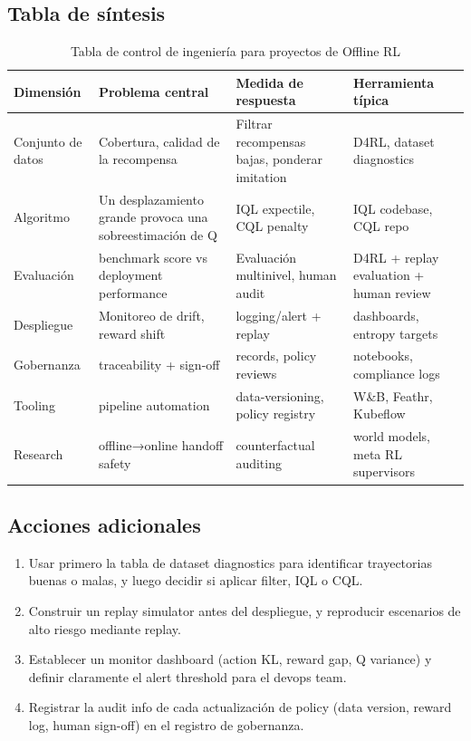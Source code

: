 \documentclass[a4paper]{article}
\begin{document}
\subsection{Tabla de síntesis}

\begin{table}[H]
\centering
\begin{tabular}{p{} p{} p{} p{}}
\toprule
Dimensión & Problema central & Medida de respuesta & Herramienta típica \\
\midrule
Conjunto de datos & Cobertura, calidad de la recompensa & Filtrar recompensas bajas, ponderar imitation & D4RL, dataset diagnostics \\
Algoritmo & Un desplazamiento grande provoca una sobreestimación de Q & IQL expectile, CQL penalty & IQL codebase, CQL repo \\
Evaluación & benchmark score vs deployment performance & Evaluación multinivel, human audit & D4RL + replay evaluation + human review \\
Despliegue & Monitoreo de drift, reward shift & logging/alert + replay & dashboards, entropy targets \\
Gobernanza & traceability + sign-off & records, policy reviews & notebooks, compliance logs \\
Tooling & pipeline automation & data-versioning, policy registry & W\&B, Feathr, Kubeflow \\
Research & offline→online handoff safety & counterfactual auditing & world models, meta RL supervisors \\
\bottomrule
\end{tabular}
\caption{Tabla de control de ingeniería para proyectos de Offline RL}
\end{table}

\subsection{Acciones adicionales}

\begin{enumerate}
    \item Usar primero la tabla de dataset diagnostics para identificar trayectorias buenas o malas, y luego decidir si aplicar filter, IQL o CQL.
    \item Construir un replay simulator antes del despliegue, y reproducir escenarios de alto riesgo mediante replay.
    \item Establecer un monitor dashboard (action KL, reward gap, Q variance) y definir claramente el alert threshold para el devops team.
    \item Registrar la audit info de cada actualización de policy (data version, reward log, human sign-off) en el registro de gobernanza.
\end{enumerate}
\end{document}
